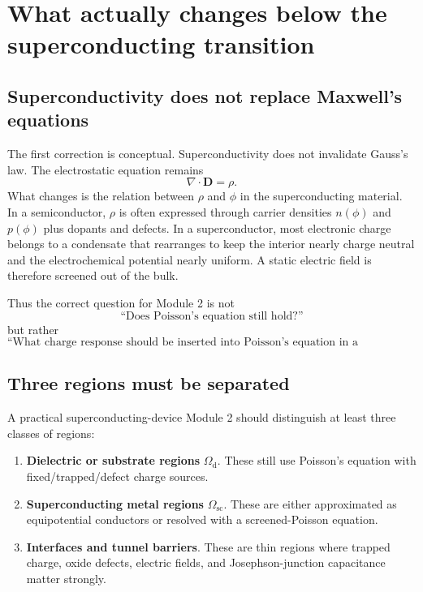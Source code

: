 \documentclass[11pt]{article}
\newcommand{\Dvec}{\mathbf{D}}
\newcommand{\Omd}{\Omega_{\mathrm{d}}}
\newcommand{\Oms}{\Omega_{\mathrm{sc}}}
\begin{document}
\section{What actually changes below the superconducting transition}

\subsection{Superconductivity does not replace Maxwell's equations}

The first correction is conceptual. Superconductivity does not invalidate Gauss's law. The electrostatic equation remains
\begin{equation}
\nabla\cdot\Dvec=\rho.
\end{equation}
What changes is the relation between $\rho$ and $\phi$ in the superconducting material. In a semiconductor, $\rho$ is often expressed through carrier densities $n(\phi)$ and $p(\phi)$ plus dopants and defects. In a superconductor, most electronic charge belongs to a condensate that rearranges to keep the interior nearly charge neutral and the electrochemical potential nearly uniform. A static electric field is therefore screened out of the bulk.

Thus the correct question for Module 2 is not
\begin{equation}
\text{``Does Poisson's equation still hold?''}
\end{equation}
but rather
\begin{equation}
\text{``What charge response should be inserted into Poisson's equation in a superconducting region?''}
\end{equation}

\subsection{Three regions must be separated}

A practical superconducting-device Module 2 should distinguish at least three classes of regions:
\begin{enumerate}[leftmargin=2em]
\item \textbf{Dielectric or substrate regions} $\Omd$. These still use Poisson's equation with fixed/trapped/defect charge sources.
\item \textbf{Superconducting metal regions} $\Oms$. These are either approximated as equipotential conductors or resolved with a screened-Poisson equation.
\item \textbf{Interfaces and tunnel barriers}. These are thin regions where trapped charge, oxide defects, electric fields, and Josephson-junction capacitance matter strongly.
\end{enumerate}
\end{document}
